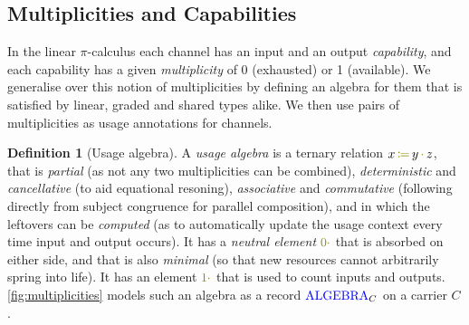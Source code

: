 \documentclass[sigplan,10pt,anonymous,review]{acmart}
\theoremstyle{definition}
\newtheorem{nidefinition}{Definition}
\newcommand{\picalc}{$\pi$-calculus}
\newcommand{\type}[1]{\textcolor{blue}{\operatorname{#1}}}
\newcommand{\func}[1]{\textcolor{olive}{\operatorname{#1}}}
\newcommand{\op}[3]{#1 \, \func{\coloneqq} \, #2 \, \func{\cdot} \, #3}
\newcommand{\zero}{\func{0\cdot}}
\newcommand{\one}{\func{1\cdot}}
\newcommand{\Algebra}{\type{ALGEBRA}}
\begin{document}
\subsection{Multiplicities and Capabilities}
\label{multiplicities}

In the linear \picalc{} each channel has an input and an output \emph{capability}, and each capability has a given \emph{multiplicity} of 0 (exhausted) or 1 (available).
We generalise over this notion of multiplicities by defining an algebra for them that is satisfied by linear, graded and shared types alike.
We then use pairs of multiplicities as usage annotations for channels.

\begin{nidefinition}[Usage algebra]
  A \emph{usage algebra} is a ternary relation $\op{x}{y}{z}$, that is \emph{partial} (as not any two multiplicities can be combined), \emph{deterministic} and \emph{cancellative} (to aid equational resoning), \emph{associative} and \emph{commutative} (following directly from subject congruence for parallel composition), and in which the leftovers can be \emph{computed} (as to automatically update the usage context every time input and output occurs).
  It has a \emph{neutral element} $\zero$ that is absorbed on either side, and that is also \emph{minimal} (so that new resources cannot arbitrarily spring into life).
  It has an element $\one$ that is used to count inputs and outputs.
  \autoref{fig:multiplicities} models such an algebra as a record $\Algebra_C$ on a carrier $C$.


\end{nidefinition}
\end{document}
